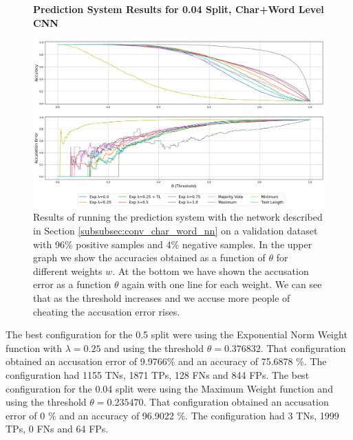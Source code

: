 \begin{figure}
    \centering
    \textbf{Prediction System Results for 0.04 Split, Char+Word Level CNN}\par\medskip
    \includegraphics[scale=0.35]{./pictures/experiments/conv_char_word_nn/prediction_system_04.png}
    \caption{Results of running the prediction system with the network described
        in Section \ref{subsubsec:conv_char_word_nn} on a validation dataset
        with 96\% positive samples and 4\% negative samples. In the upper graph
        we show the accuracies obtained as a function of $\theta$ for different
        weights $w$. At the bottom we have shown the accusation error as a
        function $\theta$ again with one line for each weight. We can see that
        as the threshold increases and we accuse more people of cheating the
        accusation error rises.}
    \label{fig:conv-char-word-NN-pred-4}
\end{figure}

The best configuration for the 0.5 split were using the Exponential Norm Weight
function with $\lambda = 0.25$ and using the threshold $\theta = 0.376832$.
That configuration obtained an accusation error of 9.9766\% and an accuracy of
75.6878 \%. The configuration had 1155 \gls{TN}s, 1871 \gls{TP}s, 128 \gls{FN}s
and 844 \gls{FP}s. The best configuration for the 0.04 split were using the
Maximum Weight function and using the threshold $\theta = 0.235470$. That
configuration obtained an accusation error of 0 \% and an accuracy of 96.9022
\%. The configuration had 3 \gls{TN}s, 1999 \gls{TP}s, 0 \gls{FN}s and 64
\gls{FP}s.
